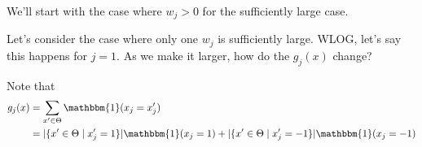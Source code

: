\documentclass{article}
\begin{document}
We'll start with the case where $w_j > 0$ for the sufficiently large case.

Let's consider the case where only one $w_j$ is sufficiently large.
WLOG, let's say this happens for $j = 1$.
As we make it larger, how do the $g_j(x)$ change?

Note that
\begin{align}
  g_j(x)
  &= \sum_{ x' \in \Theta } \mathbbm{1}(x_j = x_j') \\
  &= | \{ x' \in \Theta \mid x_j' = 1 \} | \mathbbm{1}(x_j = 1) + | \{ x' \in \Theta \mid x_j' = -1 \} | \mathbbm{1}(x_j = -1)
\end{align}
\end{document}
